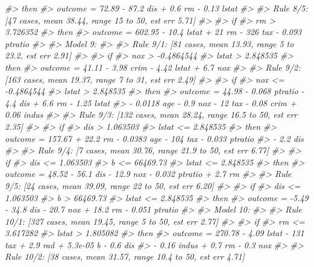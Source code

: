 \documentclass[]{book}
\newenvironment{Shaded}{\begin{snugshade}}{\end{snugshade}}
\newcommand{\CommentTok}[1]{\textcolor[rgb]{0.56,0.35,0.01}{\textit{#1}}}
\begin{document}
\begin{Shaded}
\begin{Highlighting}[]
\CommentTok{#>     then}
\CommentTok{#>  outcome = 72.89 - 87.2 dis + 0.6 rm - 0.13 lstat}
\CommentTok{#> }
\CommentTok{#>   Rule 8/5: [47 cases, mean 38.44, range 15 to 50, est err 5.71]}
\CommentTok{#> }
\CommentTok{#>     if}
\CommentTok{#>  rm > 3.726352}
\CommentTok{#>     then}
\CommentTok{#>  outcome = 602.95 - 10.4 lstat + 21 rm - 326 tax - 0.093 ptratio}
\CommentTok{#> }
\CommentTok{#> Model 9:}
\CommentTok{#> }
\CommentTok{#>   Rule 9/1: [81 cases, mean 13.93, range 5 to 23.2, est err 2.91]}
\CommentTok{#> }
\CommentTok{#>     if}
\CommentTok{#>  nox > -0.4864544}
\CommentTok{#>  lstat > 2.848535}
\CommentTok{#>     then}
\CommentTok{#>  outcome = 41.11 - 3.98 crim - 4.42 lstat + 6.7 nox}
\CommentTok{#> }
\CommentTok{#>   Rule 9/2: [163 cases, mean 19.37, range 7 to 31, est err 2.49]}
\CommentTok{#> }
\CommentTok{#>     if}
\CommentTok{#>  nox <= -0.4864544}
\CommentTok{#>  lstat > 2.848535}
\CommentTok{#>     then}
\CommentTok{#>  outcome = 44.98 - 0.068 ptratio - 4.4 dis + 6.6 rm - 1.25 lstat}
\CommentTok{#>            - 0.0118 age - 0.9 nox - 12 tax - 0.08 crim + 0.06 indus}
\CommentTok{#> }
\CommentTok{#>   Rule 9/3: [132 cases, mean 28.24, range 16.5 to 50, est err 2.35]}
\CommentTok{#> }
\CommentTok{#>     if}
\CommentTok{#>  dis > 1.063503}
\CommentTok{#>  lstat <= 2.848535}
\CommentTok{#>     then}
\CommentTok{#>  outcome = 157.67 + 22.2 rm - 0.0383 age - 104 tax - 0.033 ptratio}
\CommentTok{#>            - 2.2 dis}
\CommentTok{#> }
\CommentTok{#>   Rule 9/4: [7 cases, mean 30.76, range 21.9 to 50, est err 6.77]}
\CommentTok{#> }
\CommentTok{#>     if}
\CommentTok{#>  dis <= 1.063503}
\CommentTok{#>  b <= 66469.73}
\CommentTok{#>  lstat <= 2.848535}
\CommentTok{#>     then}
\CommentTok{#>  outcome = 48.52 - 56.1 dis - 12.9 nox - 0.032 ptratio + 2.7 rm}
\CommentTok{#> }
\CommentTok{#>   Rule 9/5: [24 cases, mean 39.09, range 22 to 50, est err 6.20]}
\CommentTok{#> }
\CommentTok{#>     if}
\CommentTok{#>  dis <= 1.063503}
\CommentTok{#>  b > 66469.73}
\CommentTok{#>  lstat <= 2.848535}
\CommentTok{#>     then}
\CommentTok{#>  outcome = -5.49 - 34.8 dis - 20.7 nox + 18.2 rm - 0.051 ptratio}
\CommentTok{#> }
\CommentTok{#> Model 10:}
\CommentTok{#> }
\CommentTok{#>   Rule 10/1: [327 cases, mean 19.45, range 5 to 50, est err 2.77]}
\CommentTok{#> }
\CommentTok{#>     if}
\CommentTok{#>  rm <= 3.617282}
\CommentTok{#>  lstat > 1.805082}
\CommentTok{#>     then}
\CommentTok{#>  outcome = 270.78 - 4.09 lstat - 131 tax + 2.9 rad + 5.3e-05 b - 0.6 dis}
\CommentTok{#>            - 0.16 indus + 0.7 rm - 0.3 nox}
\CommentTok{#> }
\CommentTok{#>   Rule 10/2: [38 cases, mean 31.57, range 10.4 to 50, est err 4.71]}

\end{Highlighting}
\end{Shaded}
\end{document}
